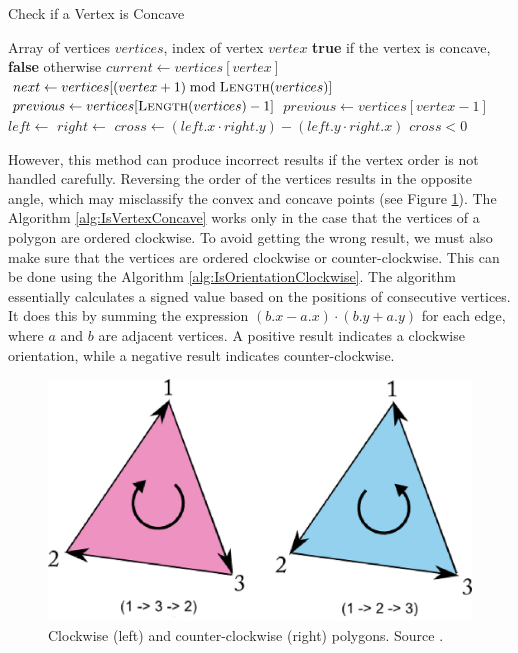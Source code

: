 \algrenewcommand{}
\algrenewcommand{}
\renewcommand{\alglinenumber}[1]{#1.}  %
\begin{algorithm}[H]
\caption{Check if a Vertex is Concave}\label{alg:IsVertexConcave}
\begin{algorithmic}[1]
\Require Array of vertices $vertices$, index of vertex $vertex$
\Ensure \textbf{true} if the vertex is concave, \textbf{false} otherwise
\Statex
{}
    \State $current \gets vertices[vertex]$
    \State $next \gets vertices[(vertex + 1) \bmod \Call{Length}{vertices}]$
        \State $previous \gets vertices[\Call{Length}{vertices} - 1]$
    \Else
        \State $previous \gets vertices[vertex - 1]$
    \EndIf
    \State $left \gets$ 
    \State $right \gets$ 
    \State $cross \gets (left.x \cdot right.y) - (left.y \cdot right.x)$
    \State \Return $cross < 0$
\EndFunction
\end{algorithmic}
\end{algorithm}

However, this method can produce incorrect results if the vertex order is not handled carefully. Reversing the order of the vertices results in the opposite angle, which may misclassify the convex and concave points (see Figure \ref{fig:Clock}). The Algorithm \ref{alg:IsVertexConcave} works only in the case that the vertices of a polygon are ordered clockwise. To avoid getting the wrong result, we must also make sure that the vertices are ordered clockwise or counter-clockwise. This can be done using the Algorithm \ref{alg:IsOrientationClockwise}.
The algorithm essentially calculates a signed value based on the positions of consecutive vertices. It does this by summing the expression $(b.x-a.x)\cdot(b.y+a.y)$ for each edge, where $a$ and $b$ are adjacent vertices. A positive result indicates a clockwise orientation, while a negative result indicates counter-clockwise.

\begin{figure}[H]
\centering
\includegraphics[width=.6\linewidth]{img/clock.png}
\caption{Clockwise (left) and counter-clockwise (right) polygons. Source \cite{Clock}.}
\label{fig:Clock}
\end{figure}

